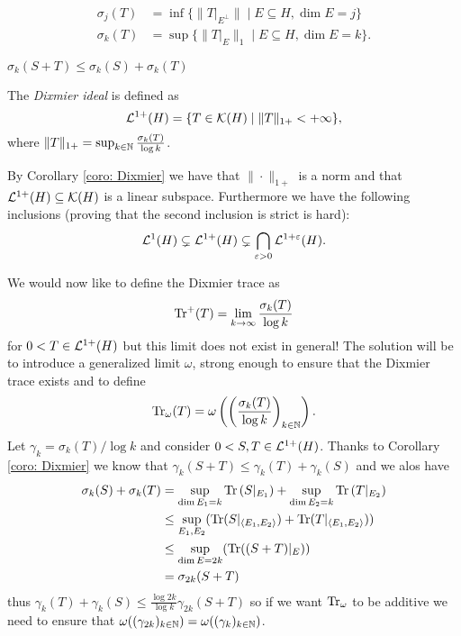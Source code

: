 \begin{lemma}
 \begin{align*}
  \sigma_j(T)&=\inf\{\|T|_{E^\perp}\|\mid E\subseteq H, \dim E=j\}\\
  \sigma_k(T)&=\sup\{\|T|_{E}\|_1\mid E\subseteq H,\dim E=k\}.
 \end{align*}
\end{lemma}
\begin{corollary}\label{coro: Dixmier}
 $\sigma_k(S+T)\leq\sigma_k(S)+\sigma_k(T)$
\end{corollary}

\begin{definition}
 The \emph{Dixmier ideal} is defined as $$\mathcal{L}^{1+}(H)=\{T\in\mathcal{K}(H)\mid\|T\|_{1+}<+\infty\},$$ where $\|T\|_{1+}=\sup_{k\in\mathbb{N}}\frac{\sigma_k(T)}{\log k}$.
\end{definition}

\noindent By Corollary \eqref{coro: Dixmier} we have that $\|\cdot\|_{1+}$ is a norm and that $\mathcal{L}^{1+}(H)\subseteq\mathcal{K}(H)$ is a linear subspace. Furthermore we have the following inclusions (proving that the second inclusion is strict is hard):
$$\mathcal{L}^1(H)\subsetneq\mathcal{L}^{1+}(H)\subsetneq\bigcap_{\varepsilon>0}\mathcal{L}^{1+\varepsilon}(H).$$


\noindent We would now like to define the Dixmier trace as $$\mathrm{Tr}^+(T)=\lim_{k\to\infty}\frac{\sigma_k(T)}{\log k}$$ for $0<T\in\mathcal{L}^{1+}(H)$ but this limit does not exist in general! The solution will be to introduce a generalized limit $\omega$, strong enough to ensure that the Dixmier trace exists and to define $$\mathrm{Tr}_\omega(T)=\omega\left(\left(\frac{\sigma_k(T)}{\log k}\right)_{k\in\mathbb{N}}\right).$$ Let $\gamma_k=\sigma_k(T)/\log k$ and consider $0<S,T\in\mathcal{L}^{1+}(H)$. Thanks to Corollary \eqref{coro: Dixmier} we know that $\gamma_k(S+T)\leq\gamma_k(T)+\gamma_k(S)$ and we alos have
\begin{align*}
 \sigma_k(S)+\sigma_k(T)&=\sup_{\dim E_1=k}\mathrm{Tr}\left(S|_{E_1}\right)+\sup_{\dim E_2=k}\mathrm{Tr}\left(T|_{E_2}\right) \\
 &\leq\sup_{E_1,E_2}(\mathrm{Tr}(S|_{\langle E_1,E_2\rangle})+\mathrm{Tr}(T|_{\langle E_1,E_2\rangle}))\\
 &\leq\sup_{\dim E=2k}(\mathrm{Tr}((S+T)|_E))\\
 &=\sigma_{2k}(S+T)
\end{align*}
thus $\gamma_k(T)+\gamma_k(S)\leq\frac{\log 2k}{\log k}\gamma_{2k}(S+T)$ so if we want $\mathrm{Tr}_\omega$ to be additive we need to ensure that $\omega((\gamma_{2k})_{k\in\mathbb{N}})=\omega((\gamma_k)_{k\in\mathbb{N}})$.

